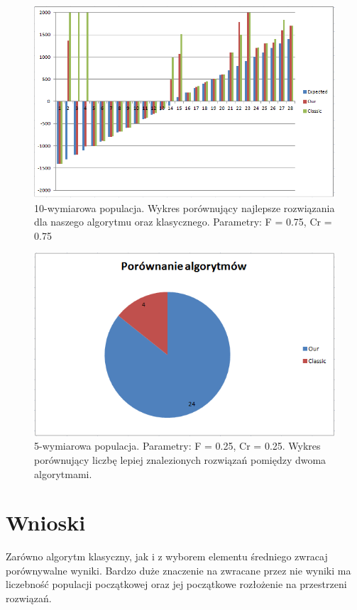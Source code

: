 \documentclass[a4paper]{article}
\begin{document}
\begin{figure}[!h]
\centering
\includegraphics[width=\textwidth]{F75Cr75L10chart.png}
\caption{10-wymiarowa populacja. Wykres porównujący najlepsze rozwiązania dla naszego algorytmu oraz klasycznego. Parametry: F = 0.75, Cr = 0.75}
\end{figure}

\begin{figure}[!h]
\centering
\includegraphics[width=\textwidth]{F75Cr75L10statystyka.png}
\caption{5-wymiarowa populacja. Parametry: F = 0.25, Cr = 0.25. Wykres porównujący liczbę lepiej znalezionych rozwiązań pomiędzy dwoma algorytmami.}
\end{figure}

\section{Wnioski}
Zarówno algorytm klasyczny, jak i z wyborem elementu średniego zwracaj porównywalne wyniki. Bardzo duże znaczenie na zwracane przez nie wyniki ma liczebność populacji początkowej oraz jej początkowe rozłożenie na przestrzeni rozwiązań. 
\end{document}
